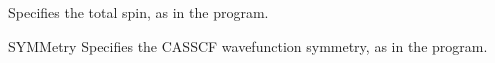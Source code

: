 \begin{keywordlist}
Specifies the total spin, as in the  program.
\item[SYMMetry]
Specifies the CASSCF wavefunction symmetry, as in the  program.
\end{keywordlist}



